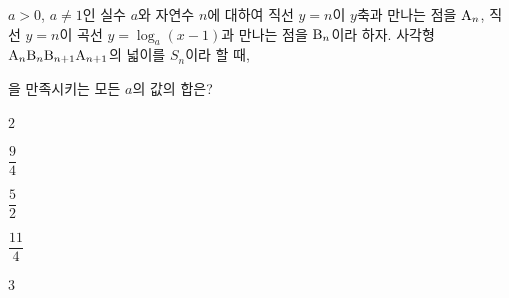$a>0$, $a\ne 1$인 실수 $a$와 자연수 $n$에 대하여 직선 $y=n$이 $y$축과 만나는 점을 $\mathrm{A}_n$, 직선 $y=n$이 곡선 $y=\log_a(x-1)$과 만나는 점을 $\mathrm{B}_n$이라 하자. 사각형~$\mathrm{A}_n\mathrm{B}_n\mathrm{B}_{n+1}\mathrm{A}_{n+1}$의 넓이를 $S_n$이라 할 때, \par\smallskip{}\par\smallskip\noindent 을 만족시키는 모든 $a$의 값의 합은?
\begin{choices32}{\rule[-3ex]{0pt}{8ex}$2$}{\rule[-3ex]{0pt}{8ex}$\dfrac{9}{4}$}{\rule[-3ex]{0pt}{8ex}$\dfrac{5}{2}$}{\rule[-3ex]{0pt}{8ex}$\dfrac{11}{4}$}{\rule[-3ex]{0pt}{8ex}$3$}\end{choices32}
